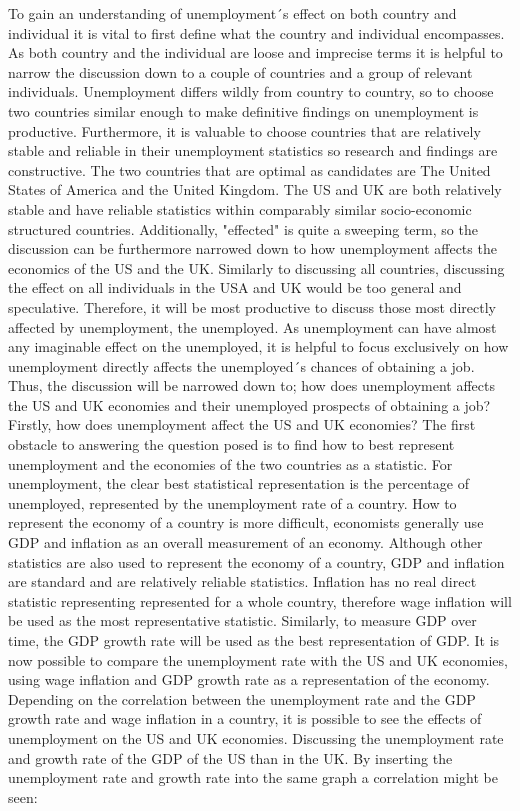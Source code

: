 To gain an understanding of unemployment´s effect on both country and individual it is vital to first define what the country and individual encompasses.
As both country and the individual are loose and imprecise terms it is helpful to narrow the discussion down to a couple of countries and a group of relevant individuals.
Unemployment differs wildly from country to country, so to choose two countries similar enough to make definitive findings on unemployment is productive.
Furthermore, it is valuable to choose countries that are relatively stable and reliable in their unemployment statistics so research and findings are constructive.
The two countries that are optimal as candidates are The United States of America and the United Kingdom.
The US and UK are both relatively stable and have reliable statistics within comparably similar socio-economic structured countries. \cite{Economic_similarities_US_UK}
Additionally, "effected" is quite a sweeping term, so the discussion can be furthermore narrowed down to how unemployment affects the economics of the US and the UK.
Similarly to discussing all countries, discussing the effect on all individuals in the USA and UK would be too general and speculative.
Therefore, it will be most productive to discuss those most directly affected by unemployment, the unemployed.
As unemployment can have almost any imaginable effect on the unemployed, it is helpful to focus exclusively on how unemployment directly affects the unemployed´s chances of obtaining a job.
Thus, the discussion will be narrowed down to; how does unemployment affects the US and UK economies and their unemployed prospects of obtaining a job? \\

Firstly, how does unemployment affect the US and UK economies?
The first obstacle to answering the question posed is to find how to best represent unemployment and the economies of the two countries as a statistic.
For unemployment, the clear best statistical representation is the percentage of unemployed, represented by the unemployment rate of a country.
How to represent the economy of a country is more difficult, economists generally use GDP and inflation as an overall measurement of an economy.
Although other statistics are also used to represent the economy of a country, GDP and inflation are standard and are relatively reliable statistics. \cite{GDP_Inflation_Economics} 
Inflation has no real direct statistic representing represented for a whole country, therefore wage inflation will be used as the most representative statistic.
Similarly, to measure GDP over time, the GDP growth rate will be used as the best representation of GDP.
It is now possible to compare the unemployment rate with the US and UK economies, using wage inflation and GDP growth rate as a representation of the economy.
Depending on the correlation between the unemployment rate and the GDP growth rate and wage inflation in a country, it is possible to see the effects of unemployment on the US and UK economies.
Discussing the unemployment rate and growth rate of the GDP of the US than in the UK.
By inserting the unemployment rate and growth rate into the same graph a correlation might be seen: \\


